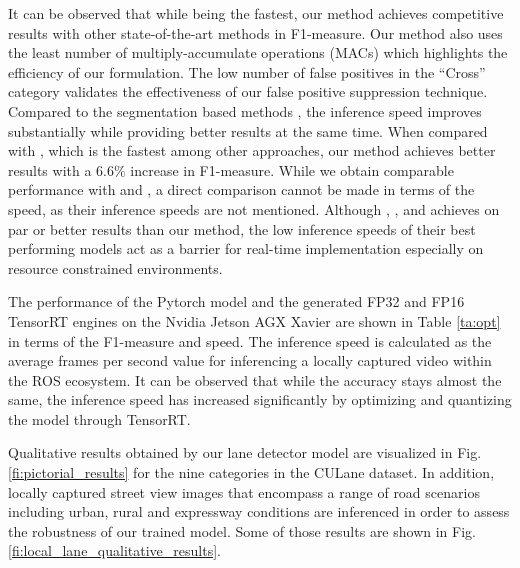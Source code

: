 \documentclass[conference]{IEEEtran}
\begin{document}
It can be observed that while being the fastest, our method achieves competitive results with other state-of-the-art methods in F1-measure. Our method also uses the least number of multiply-accumulate operations (MACs) which highlights the efficiency of our formulation. The low number of false positives in the ``Cross'' category validates the effectiveness of our false positive suppression technique. Compared to the segmentation based methods \cite{pan2018SCNN, hou2019learning}, the inference speed improves substantially while providing better results at the same time. When compared with \cite{qin2020ultra}, which is the fastest among other approaches, our method achieves better results with a 6.6\% increase in F1-measure. While we obtain comparable performance with \cite{CurveLane-NAS} and \cite{yoo2020end}, a direct comparison cannot be made in terms of the speed, as their inference speeds are not mentioned. Although \cite{pinet_2021}, \cite{resa_2020}, \cite{tabelini2021keep} and \cite{FOLO_2021_CVPR} achieves on par or better results than our method, the low inference speeds of their best performing models act as a barrier for real-time implementation especially on resource constrained environments.

The performance of the Pytorch model and the generated FP32 and FP16 TensorRT engines on the Nvidia Jetson AGX Xavier are shown in Table \ref{ta:opt} in terms of the F1-measure and speed. The inference speed is calculated as the average frames per second value for inferencing a locally captured video within the ROS ecosystem. It can be observed that while the accuracy stays almost the same, the inference speed has increased significantly by optimizing and quantizing the model through TensorRT. 

Qualitative results obtained by our lane detector model are visualized in Fig. \ref{fi:pictorial_results} for the nine categories in the CULane dataset. In addition, locally captured street view images that encompass a range of road scenarios including urban, rural and expressway conditions are inferenced in order to assess the robustness of our trained model. Some of those results are shown in Fig. \ref{fi:local_lane_qualitative_results}.
\end{document}
